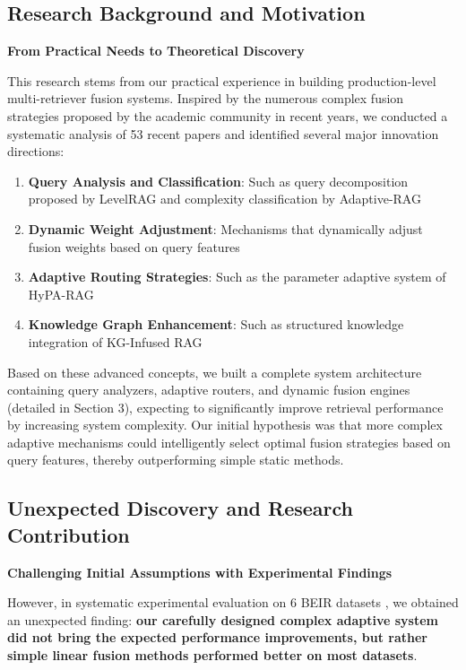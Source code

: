 \documentclass[letterpaper]{article} %
\begin{document}
\subsection{Research Background and Motivation}

\textbf{From Practical Needs to Theoretical Discovery}

This research stems from our practical experience in building production-level multi-retriever fusion systems. Inspired by the numerous complex fusion strategies proposed by the academic community in recent years, we conducted a systematic analysis of 53 recent papers and identified several major innovation directions:

\begin{enumerate}
\item \textbf{Query Analysis and Classification}: Such as query decomposition proposed by LevelRAG \cite{jiang2023levelrag} and complexity classification by Adaptive-RAG \cite{jeong2024adaptive}
\item \textbf{Dynamic Weight Adjustment}: Mechanisms that dynamically adjust fusion weights based on query features
\item \textbf{Adaptive Routing Strategies}: Such as the parameter adaptive system of HyPA-RAG \cite{su2024hypa}
\item \textbf{Knowledge Graph Enhancement}: Such as structured knowledge integration of KG-Infused RAG \cite{edge2024kg}
\end{enumerate}

Based on these advanced concepts, we built a complete system architecture containing query analyzers, adaptive routers, and dynamic fusion engines (detailed in Section 3), expecting to significantly improve retrieval performance by increasing system complexity. Our initial hypothesis was that more complex adaptive mechanisms could intelligently select optimal fusion strategies based on query features, thereby outperforming simple static methods.

\subsection{Unexpected Discovery and Research Contribution}

\textbf{Challenging Initial Assumptions with Experimental Findings}

However, in systematic experimental evaluation on 6 BEIR datasets \cite{thakur2021beir}, we obtained an unexpected finding: \textbf{our carefully designed complex adaptive system did not bring the expected performance improvements, but rather simple linear fusion methods performed better on most datasets}.
\end{document}

